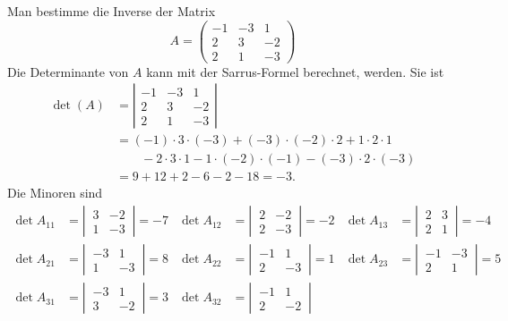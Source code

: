 \begin{beispiel}
Man bestimme die Inverse der Matrix
\[
A=\begin{pmatrix}
-1&-3&1\\
2&3&-2\\
2&1&-3
\end{pmatrix}
\]
Die Determinante von $A$ kann mit der Sarrus-Formel berechnet, werden.
Sie ist
\begin{align*}
\det(A)
&=
\left|
\begin{matrix}
-1&-3& 1\\
 2& 3&-2\\
 2& 1&-3
\end{matrix}
\right|
\\
&=(-1)\cdot 3\cdot(-3) +  (-3)\cdot(-2)\cdot 2 + 1\cdot 2\cdot 1
\\&\qquad
-2\cdot 3\cdot 1-1\cdot(-2)\cdot (-1)-(-3)\cdot 2\cdot (-3)
\\
&=9+12+2 - 6-2-18=-3.
\end{align*}
Die Minoren sind
\begin{align*}
\det A_{11}&=\left|\,\begin{matrix} 3&-2\\ 1&-3\end{matrix}\,\right|
=-7
&
\det A_{12}&=\left|\,\begin{matrix} 2&-2\\ 2&-3\end{matrix}\,\right|
=-2
&
\det A_{13}&=\left|\,\begin{matrix} 2& 3\\ 2& 1\end{matrix}\,\right|
=-4\\
\det A_{21}&=\left|\,\begin{matrix}-3& 1\\ 1&-3\end{matrix}\,\right|
=8
&
\det A_{22}&=\left|\,\begin{matrix}-1& 1\\ 2&-3\end{matrix}\,\right|
=1
&
\det A_{23}&=\left|\,\begin{matrix}-1&-3\\ 2& 1\end{matrix}\,\right|
=5\\
\det A_{31}&=\left|\,\begin{matrix}-3& 1\\ 3&-2\end{matrix}\,\right|
=3
&
\det A_{32}&=\left|\,\begin{matrix}-1& 1\\ 2&-2\end{matrix}\,\right|

\end{align*}
\end{beispiel}
